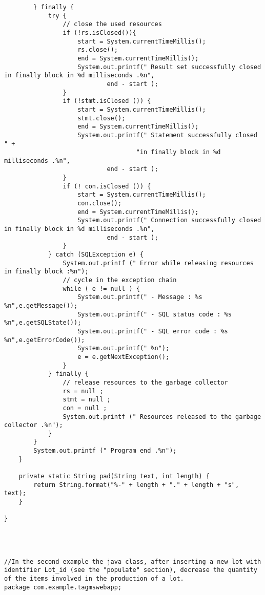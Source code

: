 \begin{lstlisting}
        } finally {
            try {
                // close the used resources
                if (!rs.isClosed()){
                    start = System.currentTimeMillis();
                    rs.close();
                    end = System.currentTimeMillis();
                    System.out.printf(" Result set successfully closed in finally block in %d milliseconds .%n",
                            end - start );
                }
                if (!stmt.isClosed ()) {
                    start = System.currentTimeMillis();
                    stmt.close();
                    end = System.currentTimeMillis();
                    System.out.printf(" Statement successfully closed " +
                                    "in finally block in %d milliseconds .%n",
                            end - start );
                }
                if (! con.isClosed ()) {
                    start = System.currentTimeMillis();
                    con.close();
                    end = System.currentTimeMillis();
                    System.out.printf(" Connection successfully closed in finally block in %d milliseconds .%n",
                            end - start );
                }
            } catch (SQLException e) {
                System.out.printf (" Error while releasing resources in finally block :%n");
                // cycle in the exception chain
                while ( e != null ) {
                    System.out.printf(" - Message : %s %n",e.getMessage());
                    System.out.printf(" - SQL status code : %s %n",e.getSQLState());
                    System.out.printf(" - SQL error code : %s %n",e.getErrorCode());
                    System.out.printf(" %n");
                    e = e.getNextException();
                }
            } finally {
                // release resources to the garbage collector
                rs = null ;
                stmt = null ;
                con = null ;
                System.out.printf (" Resources released to the garbage collector .%n");
            }
        }
        System.out.printf (" Program end .%n");
    }

    private static String pad(String text, int length) {
        return String.format("%-" + length + "." + length + "s", text);
    }

}




//In the second example the java class, after inserting a new lot with identifier Lot_id (see the "populate" section), decrease the quantity of the items involved in the production of a lot.
package com.example.tagmswebapp;


\end{lstlisting}

